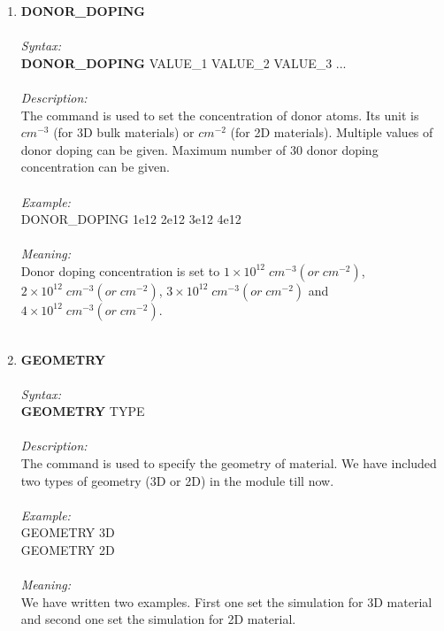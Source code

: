 \documentclass[12pt]{article}
\begin{document}
\begin{enumerate}
    \item \textbf{DONOR\_DOPING} \\ \\
    \textit{Syntax:} \\
    \textbf{DONOR\_DOPING} VALUE\_1 VALUE\_2 VALUE\_3 ... \\ \\ 
    \textit{Description:} \\
    The command is used to set the concentration of donor atoms. Its unit is $cm^{-3}$ (for 3D bulk materials) or $cm^{-2}$ (for 2D materials). Multiple values of donor doping can be given. Maximum number of 30 donor doping concentration can be given. \\ \\  
    \textit{Example:} \\
    DONOR\_DOPING 1e12 2e12 3e12 4e12 \\ \\
    \textit{Meaning:} \\  
    Donor doping concentration is set to $1 \times 10^{12} \; cm^{-3} (or \; cm^{-2})$, $2 \times 10^{12} \; cm^{-3} (or \; cm^{-2})$, $3 \times 10^{12} \; cm^{-3} (or \; cm^{-2})$ and $4 \times 10^{12} \; cm^{-3} (or \; cm^{-2})$. \\ \\

    

    \item \textbf{GEOMETRY}   \\ \\
    \textit{Syntax:} \\
    \textbf{GEOMETRY} TYPE \\ \\
    \textit{Description:} \\
    The command is used to specify the geometry of material. We have included two types of geometry (3D or 2D) in the module till now. \\ \\
    \textit{Example:} \\
    GEOMETRY 3D \\
    GEOMETRY 2D \\ \\
    \textit{Meaning:} \\   
    We have written two examples. First one set the simulation for 3D material and second one set the simulation for 2D material. \\ \\


\end{enumerate}
\end{document}
